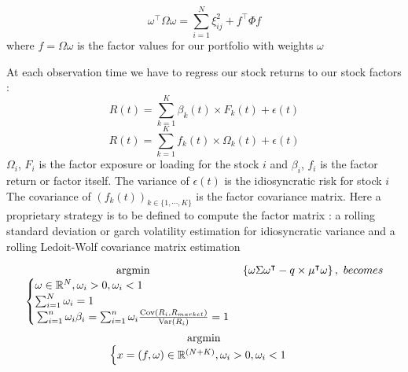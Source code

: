 \documentclass[a4, 14pts]{seminar}
\newcommand{\Var}{\mathrm{Var}}
\newcommand{\Cov}{\mathrm{Cov}}
\begin{document}
{{{{\begin{slide}
\begin{equation}
\omega^\intercal \Omega \omega =  \sum_{i=1}^{N}  \xi_{ij}^2 + f^\intercal \Phi f
\end{equation}
where $f = \Omega \omega$ is the factor values for our portfolio with weights $\omega$
\end{slide}
\begin{slide}
At each observation time we have to regress our stock returns to our stock factors :
\begin{equation}
R(t) = \sum_{k=1}^{K} \beta_k(t) \times F_k(t) + \epsilon(t)
\end{equation}
\begin{equation}
R(t) = \sum_{k=1}^{K} f_k(t) \times \Omega_k(t) + \epsilon(t)
\end{equation}
$\Omega_i$, $F_i$ is the factor exposure or loading for the stock $i$ and $\beta_i$, $f_i$ is the factor return or factor itself.
\newline
The variance of $\epsilon(t)$ is the idiosyncratic risk for stock $i$
\newline
The covariance of $(f_k(t))_{k \in \{1,\cdots,K\}}$ is the factor covariance matrix.
\newline
Here a proprietary strategy is to be defined to compute the factor matrix : a rolling standard deviation or garch volatility estimation for idiosyncratic variance and a rolling Ledoit-Wolf covariance matrix estimation
\end{slide}
{\small
\begin{slide}
\begin{equation}
\displaystyle
\operatornamewithlimits{argmin}_{\begin{cases}
\omega \in \mathbb{R}^N,\omega_i > 0,\omega_i < 1\\
\sum_{i=1}^{N}\omega_i = 1\\
\newline \sum_{i=1}^{n} \omega_i \beta_i =\sum_{i=1}^{n} \omega_i \frac{\Cov \left(R_i,R_{market} \right)}{\Var (R_i)} = 1
\end{cases}
} \left\{  \omega \Sigma \omega^\intercal - q\times \mu^\intercal\omega\right\}, \ becomes 
\end{equation}
\begin{equation}
\displaystyle
\operatornamewithlimits{argmin}_{\begin{cases}
x=(f,\omega) \in \mathbb{R}^{(N+K)},\omega_i > 0,\omega_i < 1\\

\end{cases}}
\end{equation}
\end{slide}}}}}}
\end{document}
